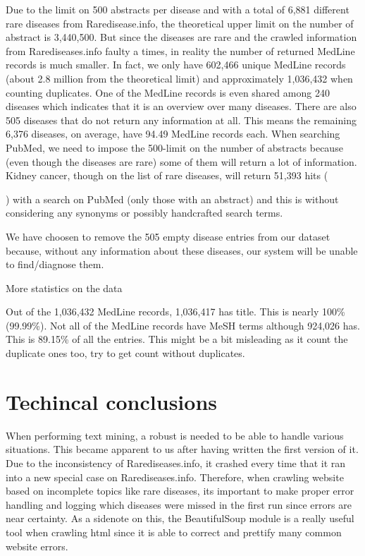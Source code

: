 Due to the limit on 500 abstracts per disease and with a total of
6,881 different rare diseases from Raredisease.info, the theoretical
upper limit on the number of abstract is 3,440,500. But since the
diseases are rare and the crawled information from Rarediseases.info
faulty a times, in reality the number of returned MedLine records is
much smaller. In fact, we only have 602,466 unique MedLine records
(about 2.8 million from the theoretical limit) and approximately
1,036,432 when counting duplicates. One of the MedLine records is even
shared among 240 diseases which indicates that it is an overview over
many diseases. There are also 505 diseases that do not return any
information at all. This means the remaining 6,376 diseases, on
average, have 94.49 MedLine records each. When searching PubMed, we
need to impose the 500-limit on the number of abstracts because (even
though the diseases are rare) some of them will return a lot of
information. Kidney cancer, though on the list of rare diseases, will
return 51,393 hits (\date{January 3, 2010}) with a search on PubMed
(only those with an abstract) and this is without considering any
synonyms or possibly handcrafted search terms.

We have choosen to remove the 505 empty disease entries from our
dataset because, without any information about these diseases, our
system will be unable to find/diagnose them.

More statistics on the data

Out of the 1,036,432 MedLine records, 1,036,417 has title. This is nearly 100\% (99.99\%). Not all of the MedLine records have MeSH terms although 924,026 has. This is 89.15\% of all the entries. This might be a bit misleading as it count the duplicate ones too, try to get count without duplicates.

\section{Techincal conclusions}

When performing text mining, a robust is needed to be able to handle
various situations. This became apparent to us after having written
the first version of it. Due to the inconsistency of
Rarediseases.info, it crashed every time that it ran into a new
special case on Rarediseases.info. Therefore, when crawling website
based on incomplete topics like rare diseases, its important to make
proper error handling and logging which diseases were missed in the
first run since errors are near certainty. As a sidenote on this, the
BeautifulSoup module is a really useful tool when crawling html since
it is able to correct and prettify many common website errors.

